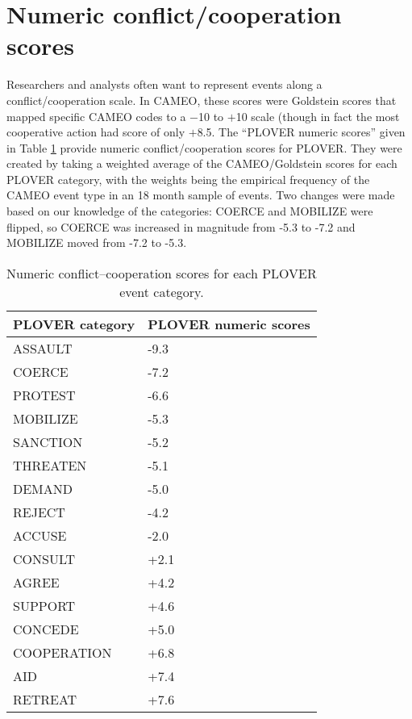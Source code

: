 \documentclass[11pt]{report}
\begin{document}
\clearpage

\section{Numeric conflict/cooperation scores}

Researchers and analysts often want to represent events along a conflict/cooperation scale. In CAMEO, these scores were Goldstein scores that mapped specific CAMEO codes to a $-$10 to $+$10 scale (though in fact the most cooperative action had score of only $+$8.5. The ``PLOVER numeric scores'' given in Table \ref{tab:schrodtscores} provide numeric conflict/cooperation scores for PLOVER. They were created by taking a weighted average of the CAMEO/Goldstein scores for each PLOVER category, with the weights being the empirical frequency of the CAMEO event type in an 18 month sample of events. Two changes were made based on our knowledge of the categories: COERCE and MOBILIZE were flipped, so COERCE was increased in magnitude from -5.3 to -7.2 and MOBILIZE moved from -7.2 to -5.3.

\begin{table}[htp]
\begin{center}
\begin{tabular}{ll}
\hline
\textbf{PLOVER category} & \textbf{PLOVER numeric scores} \\
\hline
ASSAULT  & -9.3\\
COERCE & -7.2\\
PROTEST & -6.6\\
MOBILIZE & -5.3\\
SANCTION & -5.2\\
THREATEN & -5.1\\
DEMAND & -5.0\\
REJECT & -4.2\\
ACCUSE &  -2.0\\
CONSULT &  +2.1\\
AGREE & +4.2\\
SUPPORT & +4.6\\
CONCEDE & +5.0\\
COOPERATION & +6.8\\
AID & +7.4\\
RETREAT & +7.6 \\
\hline
\end{tabular}
\end{center}
\label{tab:schrodtscores}
\caption{Numeric conflict--cooperation scores for each PLOVER event category.}
\end{table}
\end{document}
